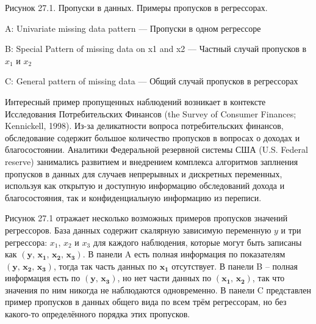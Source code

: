 \vspace{3cm}
Рисунок 27.1. Пропуски в данных. Примеры пропусков в регрессорах.

A: Univariate missing data pattern --- Пропуски в одном регрессоре

B: Special Pattern of missing data on x1 and x2 --- Частный случай пропусков в $x_1$ и $x_2$

C: General pattern of missing data --- Общий случай пропусков в регрессорах



Интересный пример пропущенных наблюдений возникает в контексте Исследования Потребительских Финансов (the Survey of Consumer Finances; Kennickell, 1998). Из-за деликатности вопроса потребительских финансов, обследование содержит большое количество пропусков в вопросах о доходах и благосостоянии. Аналитики Федеральной резервной системы США (U.S. Federal reserve) занимались развитием и внедрением комплекса алгоритмов заплнения пропусков в данных для случаев непрерывных и дискретных переменных, используя как открытую и доступную информацию обследований дохода и благосостояния, так и конфиденциальную информацию из переписи.

Рисунок 27.1 отражает несколько возможных примеров пропусков значений регрессоров. База данных содержит скалярную зависимую переменную $y$ и три регрессора: $x_1$, $x_2$ и $x_3$ для каждого наблюдения, которые могут быть записаны как $(\mathbf{y, \, x_1, \, x_2, \, x_3})$. В панели A есть полная информация по показателям $(\mathbf{y, \, x_2, \, x_3})$, тогда так часть данных по $\mathbf{x_1}$ отсутствует. В панели B – полная информация есть по $(\mathbf{y, \, x_3})$, но нет части данных по $(\mathbf{x_1, \, x_2})$, так что значения по ним никогда не наблюдаются одновременно. В панели C представлен пример пропусков в данных общего вида по всем трём  регрессорам, но без какого-то определённого порядка этих пропусков.  

